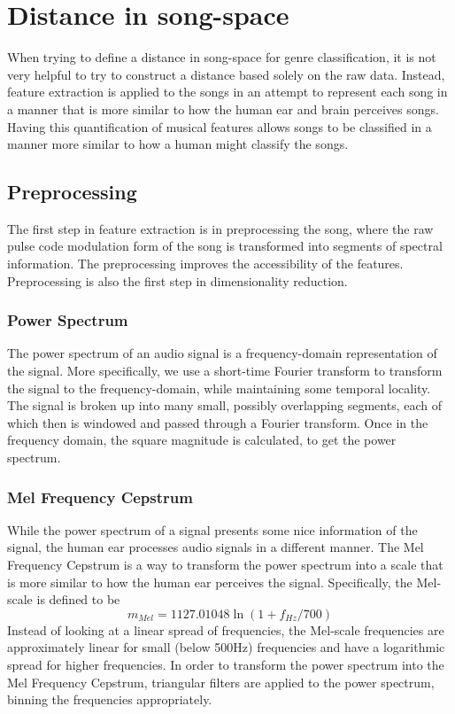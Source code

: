 \documentclass[12pt]{article}
\begin{document}
\section{Distance in song-space}


When trying to define a distance in song-space for genre classification, it is not very helpful to try to construct a distance based solely on the raw data.  Instead, feature extraction is applied to the songs in an attempt to represent each song in a manner that is more similar to how the human ear and brain perceives songs.  Having this quantification of musical features allows songs to be classified in a manner more similar to how a human might classify the songs.

\subsection{Preprocessing}

The first step in feature extraction is in preprocessing the song, where the raw pulse code modulation form of the song is transformed into segments of spectral information.  The preprocessing improves the accessibility of the features.  Preprocessing is also the first step in dimensionality reduction.

\subsubsection{Power Spectrum}
The power spectrum of an audio signal is a frequency-domain representation of the signal.  More specifically, we use a short-time Fourier transform to transform the signal to the frequency-domain, while maintaining some temporal locality.  The signal is broken up into many small, possibly overlapping segments, each of which then is windowed and passed through a Fourier transform.  Once in the frequency domain, the square magnitude is calculated, to get the power spectrum.

\subsubsection{Mel Frequency Cepstrum}
While the power spectrum of a signal presents some nice information of the signal, the human ear processes audio signals in a different manner.  The Mel Frequency Cepstrum is a way to transform the power spectrum into a scale that is more similar to how the human ear perceives the signal.  Specifically, the Mel-scale is defined to be
$$ m_{Mel} = 1127.01048 \ln(1 + f_{Hz}/700) $$
Instead of looking at a linear spread of frequencies, the Mel-scale frequencies are approximately linear for small (below 500Hz) frequencies and have a logarithmic spread for higher frequencies.  In order to transform the power spectrum into the Mel Frequency Cepstrum, triangular filters are applied to the power spectrum, binning the frequencies appropriately.
\end{document}
